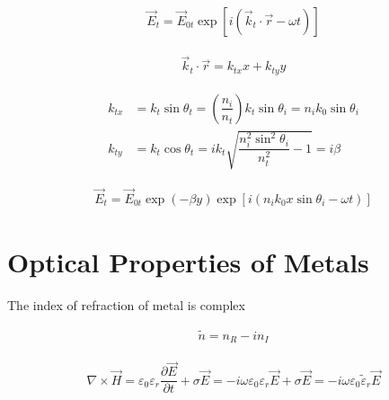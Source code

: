 \begin{equation*}
  \begin{aligned}
    \vec{E}_t = \vec{E}_{0t} \exp \left[ i \left( \vec{k}_t  \cdot \vec{r} - \omega t \right) \right]
  \end{aligned}
\end{equation*}

\begin{equation*}
  \begin{aligned}
    \vec{k}_t \cdot \vec{r} = k_{tx} x + k_{ty} y
  \end{aligned}
\end{equation*}

\begin{equation*}
  \begin{aligned}
    k_{tx} &= k_t \sin \theta_t = \left( \dfrac{n_i}{n_t}  \right) k_t \sin \theta_i = n_i k_0 \sin \theta_i \\
    k_{ty} &= k_t \cos \theta_t = i k_t \sqrt{\dfrac{n_i^2 \sin^2 \theta_i}{n_t^2} - 1} = i \beta
  \end{aligned}
\end{equation*}

\begin{equation*}
  \begin{aligned}
    \vec{E}_t = \vec{E}_{0t} \exp \left( - \beta y \right) \exp \left[ i \left( n_i k_0 x \sin \theta_i - \omega t \right) \right]
  \end{aligned}
\end{equation*}

\section{Optical Properties of Metals}

The index of refraction of metal is complex

\begin{equation*}
  \begin{aligned}
    \tilde{n} = n_R - i n_I
  \end{aligned}
\end{equation*}

\begin{equation*}
  \begin{aligned}
    \nabla \times \vec{H} = \varepsilon_0 \varepsilon_r \dfrac{\partial \vec{E}}{\partial t} + \sigma \vec{E} = - i \omega \varepsilon_0 \varepsilon_r \vec{E} + \sigma \vec{E} = - i \omega \varepsilon_0 \tilde{\varepsilon}_r \vec{E}
  \end{aligned}
\end{equation*}

